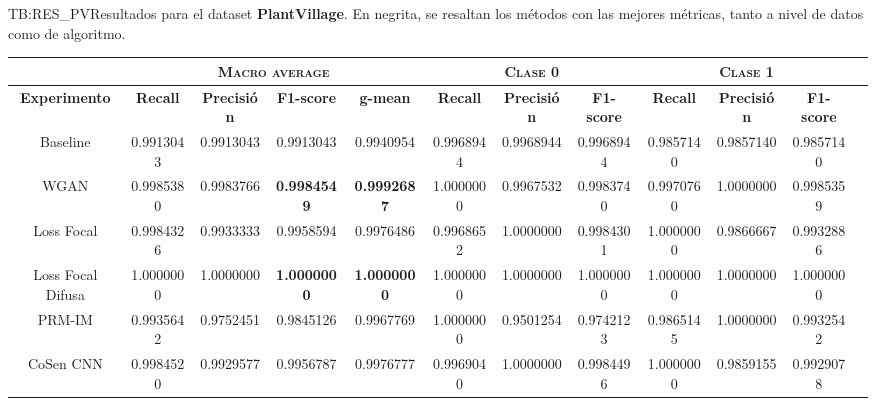 \begin{landscape}
\begin{table}[Resultados PlantVillage]{TB:RES_PV}{Resultados para el dataset \textbf{PlantVillage}. En negrita, se resaltan los métodos con las mejores métricas, tanto a nivel de datos como de algoritmo.}
    \small
    \begin{tabular}{|c|c|c|c|c|c|c|c|c|c|c|c|}
    \hline
         &  \multicolumn{4}{c|}{\textsc{Macro average}} & \multicolumn{3}{c|}{\textsc{Clase 0}} & \multicolumn{3}{c|}{\textsc{Clase 1}}\\ \hline
        \textbf{Experimento} & \textbf{Recall} & \textbf{Precisión} & \textbf{F1-score} & \textbf{g-mean} & \textbf{Recall} & \textbf{Precisión} & \textbf{F1-score} & \textbf{Recall} & \textbf{Precisión} & \textbf{F1-score} \\ \hline
        Baseline & 0.9913043 & 0.9913043 & 0.9913043 & 0.9940954 & 0.9968944 & 0.9968944 & 0.9968944 & 0.9857140 & 0.9857140 & 0.9857140 \\ \hline
        WGAN & 0.9985380 & 0.9983766 & \textbf{0.9984549} & \textbf{0.9992687} & 1.0000000 & 0.9967532 & 0.9983740 & 0.9970760 & 1.0000000 & 0.9985359 \\ \hline
        Loss Focal & 0.9984326 & 0.9933333 & 0.9958594 & 0.9976486 & 0.9968652 & 1.0000000 & 0.9984301 & 1.0000000 & 0.9866667 & 0.9932886 \\ \hline
        Loss Focal Difusa & 1.0000000 & 1.0000000 & \textbf{1.0000000} & \textbf{1.0000000} & 1.0000000 & 1.0000000 & 1.0000000 & 1.0000000 & 1.0000000 & 1.0000000 \\ \hline
        PRM-IM & 0.9935642 & 0.9752451 & 0.9845126 & 0.9967769 & 1.0000000 & 0.9501254 & 0.9742123 & 0.9865145 & 1.0000000 & 0.9932542 \\ \hline
        CoSen CNN & 0.9984520 & 0.9929577 & 0.9956787 & 0.9976777 & 0.9969040 & 1.0000000 & 0.9984496 & 1.0000000 & 0.9859155 & 0.9929078 \\ \hline
    \end{tabular}
\end{table}


\end{landscape}
